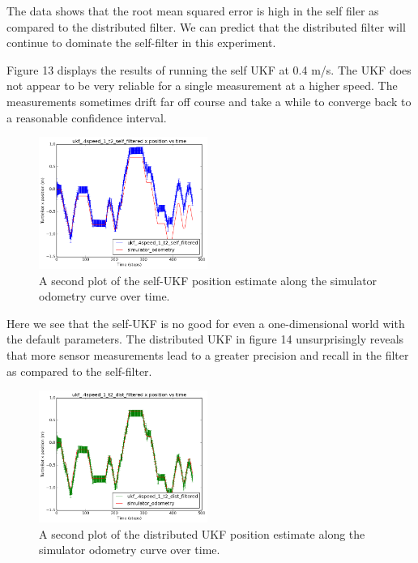 \documentclass[conference]{IEEEtran} \usepackage[T1]{fontenc} \usepackage[backend=biber, style=ieee]{biblatex}
\begin{document}
The data shows that the root mean squared error is high in the self filer as compared to the distributed filter. 
We can predict that the distributed filter will continue to dominate the self-filter in this experiment.

Figure 13 displays the results of running the self UKF at 0.4 m/s. The UKF does not 
appear to be very reliable for a single measurement at a higher speed. The measurements 
sometimes drift far off course and take a while to converge back to a reasonable 
confidence interval.

\begin{figure}
\centering 
\includegraphics[width=0.49\textwidth]{ukf_4speed_1_t2_self_filtered_pos_err_graph}
\caption {A second plot of the self-UKF position estimate along the simulator 
odometry curve over time.}
\label{pic13} 
\end{figure}

Here we see that the self-UKF is no good for even a one-dimensional world with the default parameters.
The distributed UKF in figure 14 unsurprisingly reveals that more sensor measurements lead to a greater
precision and recall in the filter as compared to the self-filter. 

\begin{figure}
\centering 
\includegraphics[width=0.49\textwidth]{ukf_4speed_1_t2_dist_filtered_pos_err_graph}
\caption {A second plot of the distributed UKF position estimate along the simulator odometry curve over time.}
\label{pic14} 
\end{figure}
\end{document}
